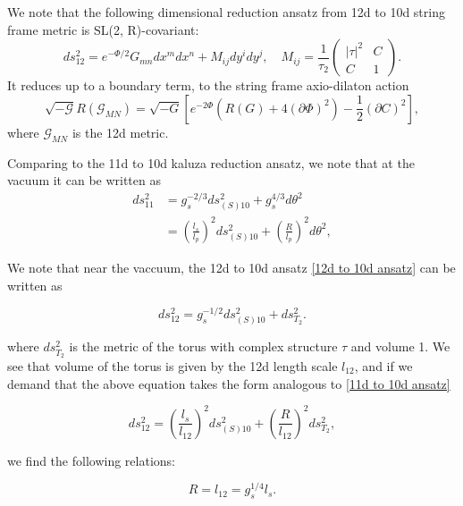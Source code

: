 We note that the following dimensional reduction ansatz from 12d to 10d string frame metric is SL(2, R)-covariant:
\begin{equation}
ds_{12}^2 = e^{-\Phi/2}G_{mn}dx^mdx^n + M_{ij}dy^idy^j,\quad
M_{ij} = \frac{1}{\tau_2}\begin{pmatrix}
|\tau|^2 & C \\ C & 1
\end{pmatrix}.
\label{12d to 10d ansatz}
\end{equation}
It reduces  up to a boundary term, to the string frame axio-dilaton action
\begin{equation}
\sqrt{-\mathcal{G}}R(\mathcal{G}_{MN}) = \sqrt{-G}\left[e^{-2\Phi}\left(R(G) +4 (\partial\Phi)^2\right)-\frac{1}{2}(\partial C)^2\right],
\end{equation}
where $\mathcal{G}_{MN}$ is the 12d metric.

Comparing to the 11d to 10d kaluza reduction ansatz, we note that at the vacuum it can be written as
\begin{equation}
\begin{aligned}
ds_{11}^2 &= g_s^{-2/3} ds_{(S)10}^2 + g_s^{4/3}d\theta^2\\
&= \left(\frac{l_s}{l_p}\right)^2 ds_{(S)10}^2 + \left(\frac{R}{l_p}\right)^2 d\theta^2,
\end{aligned}
\label{11d to 10d ansatz}
\end{equation}

We note that near the vaccuum, the 12d to 10d ansatz \eqref{12d to 10d ansatz} can be written as

\begin{equation}
ds_{12}^2 = g_s^{-1/2} ds_{(S)10}^2 + ds_{T_2}^2.
\end{equation}

where $ds_{T_2}^2$ is the metric of the torus with complex structure $\tau$ and volume 1. We see that volume of the torus is given by the 12d length scale $l_{12}$, and if we demand that the above equation takes the form analogous to \eqref{11d to 10d ansatz}

\begin{equation}
ds_{12}^2 = \left(\frac{l_s}{l_{12}}\right)^2 ds_{(S)10}^2 + \left(\frac{R}{l_{12}}\right)^2 ds_{T_2}^2,
\end{equation}

we find the following relations:

\begin{equation}
R = l_{12} = g_s^{1/4} l_s.
\end{equation}